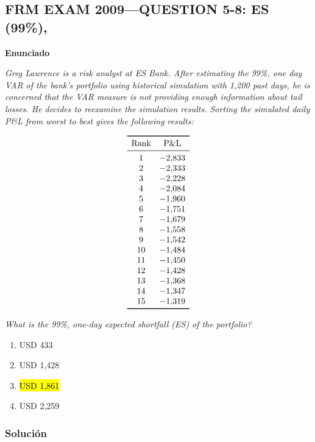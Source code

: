﻿    \subsection{FRM EXAM 2009---QUESTION 5-8: ES (99\%),}

    \textbf{Enunciado}

    \emph{Greg Lawrence is a risk analyst at ES Bank. After
    estimating the 99\%, one day VAR of the bank’s portfolio using historical simulation with
    1,200 past days, he is concerned that the VAR measure is not providing enough information
    about tail losses. He decides to reexamine the simulation results. Sorting the simulated daily
    P\&L from worst to best gives the following results:}

    \[
    \begin{array}{c c}
    \toprule
    \text{Rank} & \text{P\&L}\\
    \midrule
    1 & -2{,}833\\
    2 & -2{,}333\\
    3 & -2{,}228\\
    4 & -2{,}084\\
    5 & -1{,}960\\
    6 & -1{,}751\\
    7 & -1{,}679\\
    8 & -1{,}558\\
    9 & -1{,}542\\
    10 & -1{,}484\\
    11 & -1{,}450\\
    12 & -1{,}428\\
    13 & -1{,}368\\
    14 & -1{,}347\\
    15 & -1{,}319\\
    \bottomrule
    \end{array}
    \]


    \emph{What is the 99\%, one-day expected shortfall (ES) of the portfolio?}


    \begin{enumerate}[label=\alph*.]
    \item USD 433
    \item USD 1,428
    \item \hl{USD 1,861}
    \item USD 2,259
    \end{enumerate}

    \subsubsection*{Solución}


